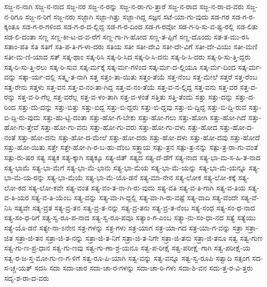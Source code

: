 {ಸಜ್ಜ-ನ-ನಾಗಿ
ಸಜ್ಜ-ನ-ನಾದ
ಸಜ್ಜ-ನರ
ಸಜ್ಜ-ನ-ರನ್ನು
ಸಜ್ಜ-ನ-ರಾ-ಗು-ತ್ತಾರೆ
ಸಜ್ಜ-ನ-ರಾದ
ಸಜ್ಜ-ನ-ರಾ-ದ-ವರು
ಸಜ್ಜ-ನ-ರಿಗೂ
ಸಜ್ಜ-ನ-ರಿಗೆ
ಸಜ್ಜ-ನರು
ಸಜ್ಜಾಗಿ
ಸಜ್ಜಾ-ಗಿತ್ತು
ಸಜ್ಜಾ-ಗಿದ್ದ
ಸಜ್ಞನ
ಸಟೆ-ಯಾ-ಗು-ವುದು
ಸಡ-ಗರ
ಸಡ-ಗ-ರ-ಕ್ಕಂತೂ
ಸಡ-ಗ-ರ-ಗಳಿಂದ
ಸಡ-ಗ-ರ-ದ-ಲ್ಲಿದ್ದ
ಸಡ-ಗ-ರ-ದಿಂದ
ಸಡ-ಗ-ರವೋ
ಸಡ-ಗ-ರಿ-ಸು-ವ-ಷ್ಟ-ರಲ್ಲಿ
ಸಡ-ಲಿತು
ಸಡ-ಲಿ-ದಂತಾ
ಸಣ್ಣ
ಸಣ್ಣ-ಕೀ-ಟ-ದ-ವ-ರೆಗೆ
ಸಣ್ಣ-ಗಾ-ಗಿ-ಹೋದ
ಸಣ್ಣ-ತ-ಪ್ಪಿಗೆ
ಸಣ್ಣ-ದೊಂದು
ಸತ-ತ-ಮು-ರಸಿ
ಸತಾಂ-ಪತಿ
ಸತಿ
ಸತಿಗೆ
ಸತಿ-ಪ-ತಿ-ಗ-ಳಾ-ದರು
ಸತಿಯ
ಸತೀ
ಸತೀ-ದೇವಿ
ಸತೀ-ದೇ-ವಿಗೆ
ಸತೀ-ದೇ-ವಿಯು
ಸತೀ-ಮಣಿ
ಸತೀ-ಮ-ಣಿ-ಯಾದ
ಸತ್
ಸತ್ಕ-ಥಾಂ
ಸತ್ಕ-ರಿಸಿ
ಸತ್ಕ-ರಿ-ಸಿದ
ಸತ್ಕ-ರಿ-ಸಿ-ದನು
ಸತ್ಕ-ರಿ-ಸಿ-ದರು
ಸತ್ಕ-ರಿ-ಸು-ತ್ತಿ-ದ್ದರು
ಸತ್ಕ-ರಿ-ಸು-ತ್ತಿ-ರಲು
ಸತ್ಕ-ರಿ-ಸುವ
ಸತ್ಕ-ರ್ಮಕ್ಕೆ
ಸತ್ಕ-ರ್ಮ-ಗಳಿಂದ
ಸತ್ಕ-ರ್ಮ-ದ-ಲ್ಲಿಯೂ
ಸತ್ಕ-ರ್ಮ-ದಿಂದ
ಸತ್ಕ-ರ್ಮ-ವನ್ನು
ಸತ್ಕಾ-ರ್ಯ-ದಲ್ಲಿ
ಸತ್ಕೃ-ತ-ನಾಗಿ
ಸತ್ತ
ಸತ್ತಂ-ತಾ-ಯಿತು
ಸತ್ತಂ-ತೆಯೆ
ಸತ್ತ-ನೆಂಬ
ಸತ್ತ-ಮೇಲೆ
ಸತ್ತರೆ
ಸತ್ತ-ರೆಂಬ
ಸತ್ತ-ರೇನು
ಸತ್ತಳು
ಸತ್ತ-ವನ
ಸತ್ತ-ವ-ನಂ-ತಾ-ಗಿದ್ದ
ಸತ್ತ-ವ-ನಂ-ತೆಯೆ
ಸತ್ತ-ವ-ನ-ಲ್ಲಿದ್ದ
ಸತ್ತ-ವನು
ಸತ್ತ-ವರ
ಸತ್ತ-ವ-ರನ್ನು
ಸತ್ತ-ವ-ರಿ-ಗೆಲ್ಲ
ಸತ್ತ-ವರೆಲ್ಲ
ಸತ್ತ-ವ-ಳಂ-ತಾಗಿ
ಸತ್ತ-ವ-ಳಂತೆ
ಸತ್ತಿತು
ಸತ್ತಿ-ತೆಂದು
ಸತ್ತು
ಸತ್ತು-ದನ್ನು
ಸತ್ತು-ದ-ರಿಂದ
ಸತ್ತು-ದು-ದನ್ನು
ಸತ್ತು-ಬಿತ್ತು
ಸತ್ತು-ಬಿದ್ದ
ಸತ್ತು-ಬಿ-ದ್ದರು
ಸತ್ತು-ಬಿ-ದ್ದವು
ಸತ್ತು-ಬಿ-ದ್ದಿದ್ದ
ಸತ್ತು-ಬಿ-ದ್ದಿ-ರುವ
ಸತ್ತು-ಬಿ-ದ್ದಿ-ರು-ವುದು
ಸತ್ತು-ಹು-ಟ್ಟಿ-ದಂತಾ
ಸತ್ತು-ಹೋ-ಗ-ಬೇಕು
ಸತ್ತು-ಹೋ-ಗಲು
ಸತ್ತು-ಹೋಗಿ
ಸತ್ತು-ಹೋ-ಗಿದೆ
ಸತ್ತು-ಹೋ-ಗು-ತ್ತೇವೆ
ಸತ್ತು-ಹೋ-ಗು-ವನು
ಸತ್ತು-ಹೋ-ಗು-ವರು
ಸತ್ತು-ಹೋ-ಗು-ವಳು
ಸತ್ತು-ಹೋದ
ಸತ್ತು-ಹೋ-ದ-ನಂತೆ
ಸತ್ತು-ಹೋ-ದನು
ಸತ್ತು-ಹೋ-ದ-ಮೇಲೆ
ಸತ್ತು-ಹೋ-ದರು
ಸತ್ತು-ಹೋ-ದಳು
ಸತ್ತು-ಹೋ-ದವು
ಸತ್ತು-ಹೋದೆ
ಸತ್ತು-ಹೋ-ಯಿತು
ಸತ್ತೇ
ಸತ್ತೇ-ಹೋ-ಗಿ-ರ-ಬ-ಹು-ದೆಂಬ
ಸತ್ತ್ವಾಯ
ಸತ್ಪು-ತ್ರನ
ಸತ್ಪು-ತ್ರ-ನನ್ನು
ಸತ್ಪು-ತ್ರ-ರಾ-ಗು-ವಂತೆ
ಸತ್ಪು-ರು-ಷರ
ಸತ್ಯ
ಸತ್ಯಕ
ಸತ್ಯ-ಕ್ಕಾಗಿ
ಸತ್ಯಕ್ಕೂ
ಸತ್ಯ-ಜಿತ್
ಸತ್ಯದ
ಸತ್ಯ-ದೆ-ಡೆಗೆ
ಸತ್ಯ-ನಾದ
ಸತ್ಯ-ಭಾ-ಮ-ಸ-ಹಿ-ತ-ನಾದ
ಸತ್ಯ-ಭಾಮೆ
ಸತ್ಯ-ಭಾ-ಮೆಗೆ
ಸತ್ಯ-ಭಾ-ಮೆ-ಭಾನು
ಸತ್ಯ-ಭಾ-ಮೆಯ
ಸತ್ಯ-ಭಾ-ಮೆ-ಯನ್ನು
ಸತ್ಯ-ಭಾ-ಮೆ-ಯನ್ನೂ
ಸತ್ಯ-ಭಾ-ಮೆ-ಯ-ರನ್ನು
ಸತ್ಯ-ಭಾ-ಮೆಯೆ
ಸತ್ಯ-ಭಾ-ಮೆ-ಯೊ-ಡನೆ
ಸತ್ಯ-ಮಾ-ನೇನ
ಸತ್ಯ-ಲೋಕ
ಸತ್ಯ-ಲೋ-ಕಕ್ಕೆ
ಸತ್ಯ-ಲೋ-ಕದ
ಸತ್ಯ-ಲೋ-ಕವೇ
ಸತ್ಯ-ವಂತ
ಸತ್ಯ-ವಂ-ತ-ನಾ-ಗಿ-ರು-ವುದು
ಸತ್ಯ-ವತಿ
ಸತ್ಯ-ವ-ತಿ-ಗಾಗಿ
ಸತ್ಯ-ವ-ತಿಯ
ಸತ್ಯ-ವ-ತಿ-ಯರ
ಸತ್ಯ-ವ-ತಿ-ಯೆಂಬ
ಸತ್ಯ-ವನ್ನು
ಸತ್ಯ-ವಾ-ಗಿ-ದ್ದಲ್ಲಿ
ಸತ್ಯ-ವಾ-ಗಿ-ರು-ವಷ್ಟೆ
ಸತ್ಯ-ವಾದಿ
ಸತ್ಯ-ವೆಂದೇ
ಸತ್ಯ-ವೆ-ನಿಸಿ
ಸತ್ಯವೇ
ಸತ್ಯ-ವ್ರತ
ಸತ್ಯ-ವ್ರ-ತನ
ಸತ್ಯ-ವ್ರ-ತ-ನನ್ನು
ಸತ್ಯ-ವ್ರ-ತನು
ಸತ್ಯ-ವ್ರ-ತ-ನೆಂಬ
ಸತ್ಯ-ಸಂಧ
ಸತ್ಯ-ಸಂ-ಧ-ನಾದ
ಸತ್ಯ-ಸಂ-ಧ-ರಿಗೆ
ಸತ್ಯ-ಸ್ವ-ರೂ-ಪ-ನಾದ
ಸತ್ಯ-ಸ್ವ-ರೂ-ಪವೂ
ಸತ್ಯಾಂ-ಗ-ಎಂಬ
ಸತ್ಯಾ-ನು-ಸಂ-ಧಾ-ನದ
ಸತ್ಯೆ
ಸತ್ಯೆಯು
ಸತ್ಯೆ-ಯೊ-ಡನೆ
ಸತ್ಯೇ-ನಾ-ಽನೇನ
ಸತ್ರ-ಗಳನ್ನು
ಸತ್ರ-ಗಳು
ಸತ್ರ-ಯಾಗ
ಸತ್ರ-ಯಾ-ಗದ
ಸತ್ರ-ಯಾ-ಗ-ವನ್ನು
ಸತ್ರಾ
ಸತ್ರಾ-ಜಿತ
ಸತ್ರಾ-ಜಿ-ತನ
ಸತ್ರಾ-ಜಿ-ತ-ನನ್ನು
ಸತ್ರಾ-ಜಿ-ತ-ನಿಗೆ
ಸತ್ರಾ-ಜಿ-ತ-ನಿಗೇ
ಸತ್ರಾ-ಜಿ-ತನು
ಸತ್ರಾ-ಜಿ-ತನೂ
ಸತ್ವ
ಸತ್ವ-ಗುಣ
ಸತ್ವ-ಗು-ಣ-ಪ್ರ-ಧಾನ
ಸತ್ವ-ಗು-ಣವು
ಸತ್ವ-ಗು-ಣಾ-ಶ್ರ-ಯನೂ
ಸತ್ವ-ಪ-ರೀಕ್ಷೆ
ಸತ್ವ-ಪರೀಕ್ಷೆ--ಗಾಗಿ
ಸತ್ವ-ಪರೀಕ್ಷೆ-ಯ
ಸತ್ವ-ರ-ಜ-ಸ್ತ-ಮೋ-ಗು-ಣ-ಗ-ಳಿಗೆ
ಸತ್ವ-ರೂ-ಪಿ-ಯಾಗಿ
ಸತ್ವ-ವನ್ನು
ಸತ್ವ-ವನ್ನೂ
ಸತ್ವ-ಸ್ವ-ರೂಪಿ
ಸತ್ವಾದಿ
ಸತ್ಸಂಗ
ಸದ-ಸ-ಚ್ಚ-ಯತ್
ಸದಸಿ
ಸದಾ
ಸದಾ-ಚಾರ
ಸದಾ-ಚಾ-ರ-ಗಳನ್ನು
ಸದಾ-ಚಾ-ರಿ-ಗಳು
ಸದಾ-ಶಿ-ವನ
ಸದು-ತ್ತ-ರ-ವಿ-ತ್ತರು
ಸದೃ-ಶ-ರಾ-ದ-ವರು
}
